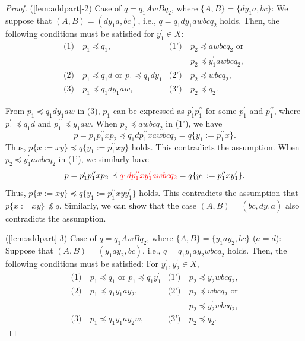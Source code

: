 \begin{proof}
\smallskip

\noindent
(\ref{lem:addpart}-2) Case of $q=q_{1}AwBq_{2}$, where $\{ A,B \} = \{ dy_{1}a,bc \}$:
We suppose that $(A, B) = (dy_{1}a, bc)$, i.e., $q = q_{1}dy_{1}awbcq_{2} $ holds.
  Then, the following conditions must be satisfied for $y_{1}^{\prime}\in X$:
  \begin{align*}
    \textrm{(1)}~& p_{1} \preceq q_{1}, & \textrm{(1')}~& p_{2} \preceq awbcq_{2}\mbox{ or } \\
    & & & p_{2} \preceq y_{1}^{\prime}awbcq_{2},\\
    \textrm{(2)}~& p_{1} \preceq q_{1}d\mbox{ or } p_{1} \preceq q_{1}dy_{1}^{\prime} & \textrm{(2')}~& p_{2} \preceq wbcq_{2}, \\
    \textrm{(3)}~& p_{1} \preceq q_{1}dy_{1}aw, & \textrm{(3')}~& p_{2} \preceq q_{2}.
  \end{align*}
  
  From $p_{1} \preceq q_{1}dy_{1}aw$ in (3), $p_{1}$ can be expressed as $p^{\prime}_{1}p^{\prime\prime}_{1}$ for some $p^{\prime}_{1}$ and $p^{\prime\prime}_{1}$, where $p^{\prime}_{1} \preceq q_{1}d$ and $p^{\prime\prime}_{1} \preceq y_{1}aw$.
  When $p_{2} \preceq awbcq_{2}$ in (1'), we have
  $$p=p^{\prime}_{1}p^{\prime\prime}_{1}xp_{2} \preceq q_{1}dp^{\prime\prime}_{1}xawbcq_{2}=q \{ y_{1}:=p^{\prime\prime}_{1}x \}.$$
  Thus, $p \{ x := xy \} \preceq q \{ y_{1}:=p^{\prime\prime}_{1}xy \}$ holds.
  This contradicts the assumption.
  When $p_{2} \preceq y_{1}^{\prime}awbcq_{2}$ in (1'), we similarly have
  $$p=p^{\prime}_{1}p^{\prime\prime}_{1}xp_{2} \preceq {\color{red}q_{1}dp^{\prime\prime}_{1}xy_{1}^{\prime}awbcq_{2}}=q \{ y_{1}:=p^{\prime\prime}_{1}xy_{1}^{\prime} \}.$$
  Thus, $p \{ x := xy \} \preceq q \{ y_{1}:=p^{\prime\prime}_{1}xyy_{1}^{\prime} \}$ holds.
  This contradicts the assumption that $p \{ x := xy \} \not\preceq q$.
  Similarly, we can show that the case $(A, B) = (bc, dy_{1}a)$ also contradicts the assumption.
  
  \smallskip

  \noindent
  (\ref{lem:addpart}-3) Case of $q=q_{1}AwBq_{2}$, where $\{ A,B \} = \{ y_{1}ay_{2},bc \}$ ($a = d$):
  Suppose that $(A, B) = (y_{1}ay_{2}, bc)$, i.e., $q = q_{1}y_{1}ay_{2}wbcq_{2} $ holds.
  Then, the following conditions must be satisfied: For $y_{1}^{\prime}, y_{2}^{\prime} \in X$,
  \begin{align*}
    \textrm{(1)}~& p_{1} \preceq q_{1}\mbox{ or } p_{1} \preceq q_{1}y_{1}^{\prime} & \textrm{(1')}~& p_{2} \preceq y_{2}wbcq_{2}, \\
    \textrm{(2)}~& p_{1} \preceq q_{1}y_{1}ay_{2}, & \textrm{(2')}~& p_{2} \preceq wbcq_{2}\mbox{ or}\\    
    & & & p_{2} \preceq y_{2}^{\prime}wbcq_{2}, \\
    \textrm{(3)}~& p_{1} \preceq q_{1}y_{1}ay_{2}w, & \textrm{(3')}~& p_{2} \preceq q_{2}.
  \end{align*}
  

\end{proof}
